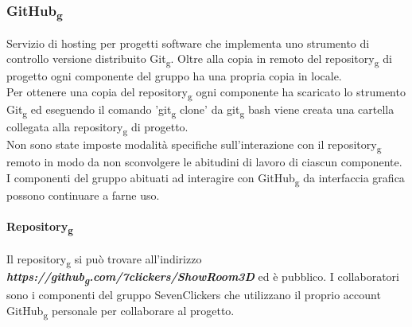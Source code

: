 \subsubsection{GitHub\textsubscript{g}}
\label{GitHub} 
Servizio di hosting per progetti software che implementa uno strumento di controllo versione distribuito Git\textsubscript{g}.
Oltre alla copia in remoto del repository\textsubscript{g} di progetto ogni componente del gruppo ha una propria copia in locale.\\
Per ottenere una copia del repository\textsubscript{g} ogni componente ha scaricato lo strumento Git\textsubscript{g} ed eseguendo il 
comando 'git\textsubscript{g} clone' da git\textsubscript{g} bash viene creata una cartella collegata alla repository\textsubscript{g} di progetto.\\
Non sono state imposte modalità specifiche sull'interazione con il repository\textsubscript{g} remoto in modo da non sconvolgere le abitudini di lavoro di 
ciascun componente.\\
I componenti del gruppo abituati ad interagire con GitHub\textsubscript{g} da interfaccia grafica possono continuare a farne uso.
\paragraph{Repository\textsubscript{g}}
Il repository\textsubscript{g} si può trovare all'indirizzo \textbf{\textit{https://github\textsubscript{g}.com/7clickers/ShowRoom3D}} ed è pubblico. 
I collaboratori sono i componenti del gruppo SevenClickers che utilizzano il proprio account GitHub\textsubscript{g} personale per collaborare al progetto.
